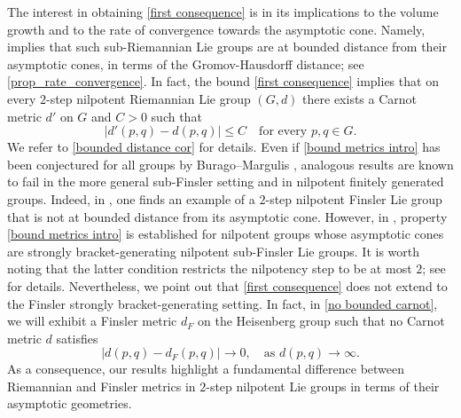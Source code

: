 \documentclass[a4paper,11pt,reqno]{amsart}
\theoremstyle{plain}
\theoremstyle{definition}
\begin{document}
The interest in obtaining \eqref{first consequence} is in its implications to the volume growth and to the rate of convergence towards the asymptotic cone. 
Namely,  implies that such sub-Riemannian Lie groups are at bounded distance from their asymptotic cones,
in terms of the Gromov-Hausdorff distance; see \cref{prop_rate_convergence}. In fact, the bound \eqref{first consequence} implies that on every $2$-step nilpotent Riemannian Lie group $(G,d)$ there exists a Carnot metric $d'$ on $G$ and $C>0$ such that
\begin{equation} \label{bound metrics intro}
 \lvert d'(p,q) - d(p,q) \rvert \le C \quad \text{for every $p,q \in G$.}
\end{equation}
We refer to \cref{bounded distance cor} for details. 
Even if \eqref{bound metrics intro} has been conjectured for all groups by Burago--Margulis \cite{MR2332168}, analogous results are known to fail in the more general sub-Finsler setting and in nilpotent finitely generated groups. Indeed, in \cite{MR3153949}, one finds an example of a $2$-step nilpotent Finsler Lie group that is not at bounded distance from its asymptotic cone. However, in \cite{MR4380060}, property \eqref{bound metrics intro} is established for nilpotent groups whose asymptotic cones are strongly bracket-generating nilpotent sub-Finsler Lie groups. It is worth noting that the latter condition restricts the nilpotency step to be at most $2$; see \cite[Appendix~A]{MR3739202} for details. Nevertheless, we point out that \eqref{first consequence} does not extend to the Finsler strongly bracket-generating setting. In fact, in \cref{no bounded carnot}, we will exhibit a Finsler metric $d_F$ on the Heisenberg group such that no Carnot metric $d$ satisfies 
\begin{equation} \label{no vanishing}
 \lvert d(p,q) - d_F(p,q) \rvert \to 0, \quad \text{as $d(p,q) \to \infty$.}
\end{equation}
As a consequence, our results highlight a fundamental difference between Riemannian and Finsler metrics in $2$-step nilpotent Lie groups in terms of their asymptotic geometries.
\end{document}
